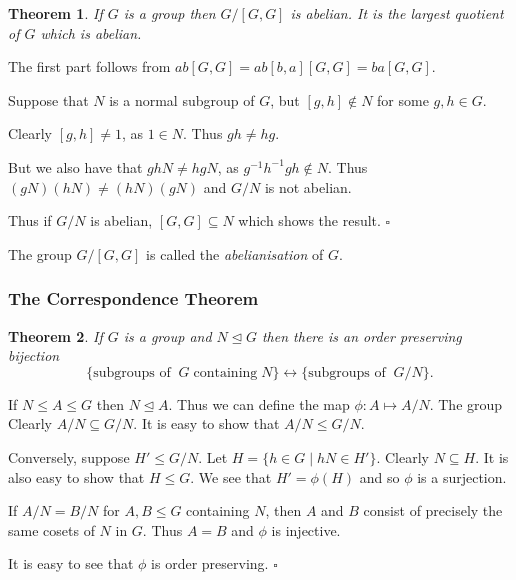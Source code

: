 \documentclass[10pt]{article}
\newtheorem{theorem}{Theorem}[section]
\newenvironment{proof}[1][Proof]{\begin{trivlist}
\item[\hskip \labelsep {\itshape #1}]}{\end{trivlist}}
\newenvironment{definition}[1][Definition]{\begin{trivlist}
\item[\hskip \labelsep {\bfseries #1}]}{\end{trivlist}}
\begin{document}
\begin{theorem}
If $G$ is a group then $G/[G, G]$ is abelian. It is the largest quotient of $G$ which is abelian.
\end{theorem}

\begin{proof}
The first part follows from $ab[G, G] = ab[b, a][G, G] = ba[G, G]$.

Suppose that $N$ is a normal subgroup of $G$, but $[g, h] \notin N$ for some $g, h \in G$.

Clearly $[g, h] \neq 1$, as $1 \in N$. Thus $gh \neq hg$.

But we also have that $ghN \neq hgN$, as $g^{-1}h^{-1}gh \notin N$. Thus $(gN)(hN) \neq (hN)(gN)$ and $G/N$ is not abelian.

Thus if $G/N$ is abelian, $[G, G] \subseteq N$ which shows the result. $\square$
\end{proof}

\begin{definition}
The group $G/[G, G]$ is called the \emph{abelianisation} of $G$.
\end{definition}

\subsubsection{The Correspondence Theorem}

\begin{theorem}
If $G$ is a group and $N \mathrel{\unlhd} G$ then there is an order preserving bijection
$$\{\mbox{subgroups of}\;\;G\;\mbox{containing}\;N \} \leftrightarrow \{\mbox{subgroups of}\;\;G/N\}.$$ 
\end{theorem}

\begin{proof}
If $N \leq A \leq G$ then $N \mathrel{\unlhd} A$. Thus we can define the map $\phi : A \mapsto A/N$. The group Clearly $A/N \subseteq G/N$. It is easy to show that $A/N \leq G/N$.

Conversely, suppose $H' \leq G/N$. Let $H = \{h \in G \;|\; hN \in H'\}$. Clearly $N \subseteq H$. It is also easy to show that $H \leq G$. We see that $H' = \phi(H)$ and so $\phi$ is a surjection.

If $A/N = B/N$ for $A, B \leq G$ containing $N$, then $A$ and $B$ consist of precisely the same cosets of $N$ in $G$. Thus $A = B$ and $\phi$ is injective.

It is easy to see that $\phi$ is order preserving. $\square$
\end{proof}
\end{document}
